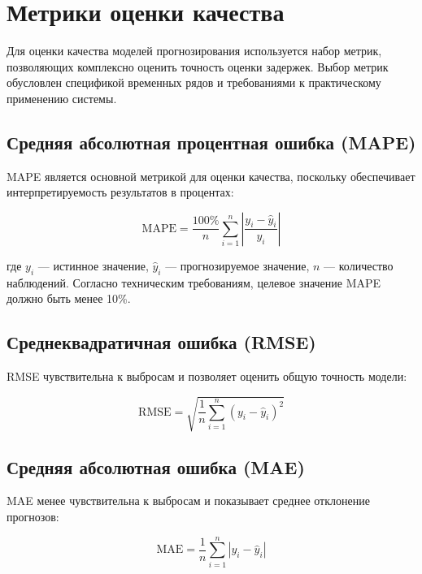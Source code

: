\section{Метрики оценки качества}
\label{sec:evaluation_metrics}

Для оценки качества моделей прогнозирования используется набор метрик, позволяющих комплексно оценить точность оценки задержек. Выбор метрик обусловлен спецификой временных рядов и требованиями к практическому применению системы.

\subsection{Средняя абсолютная процентная ошибка (MAPE)}

MAPE является основной метрикой для оценки качества, поскольку обеспечивает интерпретируемость результатов в процентах:

\begin{equation}
	\text{MAPE} = \frac{100\%}{n} \sum_{i=1}^{n} \left| \frac{y_i - \hat{y}_i}{y_i} \right|
\end{equation}

где $y_i$ — истинное значение, $\hat{y}_i$ — прогнозируемое значение, $n$ — количество наблюдений. Согласно техническим требованиям, целевое значение MAPE должно быть менее 10\%.

\subsection{Среднеквадратичная ошибка (RMSE)}

RMSE чувствительна к выбросам и позволяет оценить общую точность модели:

\begin{equation}
	\text{RMSE} = \sqrt{\frac{1}{n} \sum_{i=1}^{n} (y_i - \hat{y}_i)^2}
\end{equation}

\subsection{Средняя абсолютная ошибка (MAE)}

MAE менее чувствительна к выбросам и показывает среднее отклонение прогнозов:

\begin{equation}
	\text{MAE} = \frac{1}{n} \sum_{i=1}^{n} |y_i - \hat{y}_i|
\end{equation} 
